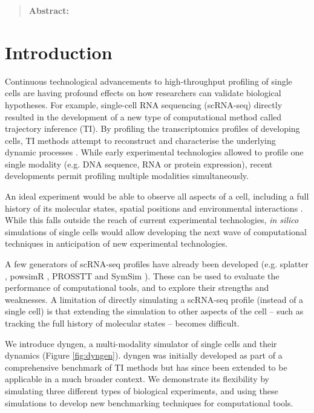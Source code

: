 
\begin{quote}
	\textbf{Abstract:} 
\end{quote}

\section{Introduction}
Continuous technological advancements to high-throughput profiling of single cells
are having profound effects on how researchers can validate biological hypotheses. 
For example, single-cell RNA sequencing (scRNA-seq) directly resulted in the development
of a new type of computational method called trajectory inference (TI). By profiling
the transcriptomics profiles of developing cells, TI methods attempt to reconstruct 
and characterise the underlying dynamic processes \cite{cannoodt_computationalmethodstrajectory_2016}.
While early experimental technologies allowed to profile one single modality (e.g. DNA sequence, 
RNA or protein expression), recent developments permit profiling multiple modalities simultaneously.

An ideal experiment would be able to observe all aspects of a cell, including a full history of its 
molecular states, spatial positions and environmental interactions \cite{stuart_integrativesinglecellanalysis_2019}. 
While this falls outside the reach of current experimental technologies, \textit{in silico} simulations
of single cells would allow developing the next wave of computational techniques
in anticipation of new experimental technologies.

A few generators of scRNA-seq profiles have already been developed (e.g. splatter \cite{zappia_splattersimulationsinglecell_2017}, powsimR \cite{vieth_powsimrpoweranalysis_2017}, PROSSTT \cite{papadopoulos_prossttprobabilisticsimulation_2018} and SymSim \cite{zhang_simulatingmultiplefaceted_2019}). These can be used to evaluate the performance of computational tools, and to explore their strengths and weaknesses. A limitation of directly simulating a scRNA-seq profile (instead of a single cell) is that extending the simulation to other aspects of the cell -- such as tracking the full history of molecular states -- becomes difficult.

We introduce dyngen, a multi-modality simulator of single cells and their dynamics (Figure \ref{fig:dyngen}).
dyngen was initially developed as part of a comprehensive benchmark of TI methods \cite{saelens_comparisonsinglecelltrajectory_2019} but has since been extended to be applicable in a much broader context.
We demonstrate its flexibility by simulating three different types of biological experiments, and using these simulations to develop new benchmarking techniques for computational tools.

